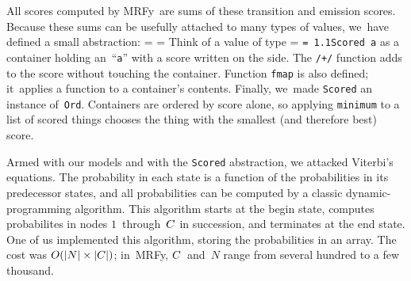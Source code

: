 \documentclass[]{jfp1}
\makeatletter
\newcommand\mrfy{MRFy} %
\newcommand\alignwidth{\ensuremath C} %
\newcommand\seclabel[1]{\label{sec:#1}}
\newif\ifverbatimsmall
\newcommand{\mono}[1]{%
  {\@tempdima = \fontdimen2\font
   \texttt{\spaceskip = 1.1\@tempdima #1}}}
\newcommand\smallverbatiminput[1]{%
  \verbatimsmalltrue
  \presvtopsep=\topsep
  \topsep=0.78\topsep
  \verbatimsmallfalse
  \topsep=\presvtopsep
}
\newcommand\smallfuzzverbatiminput[2]{%
  \hfuzz=#1 \smallverbatiminput{#2}\hfuzz=0pt }
\makeatother
\begin{document}
All scores computed by \mrfy\ are sums of these transition and
emission scores.
Because these sums can be usefully attached to many types of values,
we~have defined a small abstraction:
\smallfuzzverbatiminput{10.8pt}{vscore}
Think of a value of type \mono{Scored~a} as a container holding
 an~``\texttt a'' with a score written on the side.
The \texttt{/+/} function adds to the score without touching the
 container.
Function \texttt{fmap} is also defined; it~applies a function to a
 container's contents. 
%
Finally, we~made \texttt{Scored} an instance of~\texttt{Ord}.
Containers are ordered by score alone, so applying
\texttt{minimum} to a list of scored things chooses the thing with the
smallest (and therefore best) score.


Armed with our models and with the \texttt{Scored} abstraction, we
attacked Viterbi's equations. 
The probability in each state is a function of the probabilities
in its predecessor states, 
and all probabilities can be computed by a classic dynamic-programming
algorithm.
This algorithm starts at the {begin} state,
computes probabilites in nodes $1$~through~$\alignwidth$ in
succession, and terminates at the {end} state.
One of us implemented this algorithm, storing the probabilities in an array.
The cost was
$O(|N|\times|\alignwidth|)$;
in~MRFy, $\alignwidth$~and~$N$ range from several hundred to a few
thousand.





\seclabel{cons}
\seclabel{vee-prime}
\end{document}
